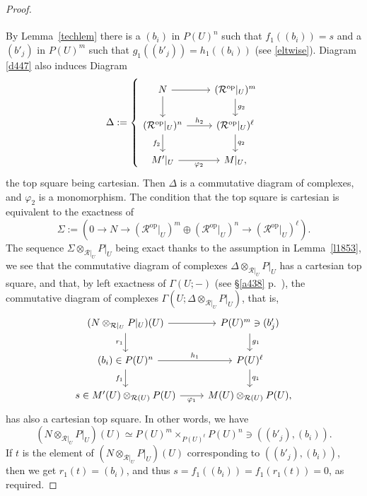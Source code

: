 \documentclass[12pt]{article}
\theoremstyle{remark}
\theoremstyle{definition}
\newcommand{\cc}{\mathcal}
\DeclareMathOperator{\op}{op}
\begin{document}
\begin{proof}
$$\begin{tikzcd}
\end{tikzcd}
$$ 
By Lemma~\ref{techlem} there is a $(b_i)$ in $P(U)^n$ such that $f_1((b_i))=s$ and a $(b'_j)$ in $P(U)^m$ such that $g_1((b'_j))=h_1((b_i))$ (see \eqref{eltwise}). Diagram \eqref{d447} also induces Diagram 
$$
\Delta:=\left\{
\begin{tikzcd}
N\ar{r}\ar{d}&(\cc R^{\op}|_U)^m\ar{d}{g_2}\\ 
(\cc R^{\op}|_U)^n\ar{r}{h_2}\ar{d}[swap]{f_2}&(\cc R^{\op}|_U)^\ell\ar{d}{q_2}\\ 
M'|_U\ar{r}[swap]{\varphi_2}&M|_U,
\end{tikzcd}
\right.
$$
the top square being cartesian. Then $\Delta$ is a commutative diagram of complexes, and $\varphi_2$ is a monomorphism. The condition that the top square is cartesian is equivalent to the exactness of 
%
\begin{equation}\label{tsc2}
\Sigma:=(0\to N\to(\cc R^{\op}|_U)^m\oplus(\cc R^{\op}|_U)^n\to(\cc R^{\op}|_U)^\ell).
\end{equation}
% 
The sequence $\Sigma\otimes_{\cc R|_U}P|_U$ being exact thanks to the assumption in Lemma~\ref{l1853}, we see that the commutative diagram of complexes $\Delta\otimes_{\cc R|_U}P|_U$ has a cartesian top square, and that, by left exactness of $\Gamma(U;-)$ (see \S\ref{a438} p.~\pageref{a438}), the commutative diagram of complexes $\Gamma(U;\Delta\otimes_{\cc R|_U}P|_U)$, that is, 
$$
\begin{tikzcd}
(N\otimes_{\cc R|_U}P|_U)(U)\ar{r}\ar{d}[swap]{r_1}&P(U)^m\ar{d}{g_1}\ni(b'_j)\\ 
(b_i)\in P(U)^n\ar{r}{h_1}\ar{d}[swap]{f_1}&P(U)^\ell\ar{d}{q_1}\\ 
s\in M'(U)\otimes_{\cc R(U)}P(U)\ar{r}[swap]{\varphi_1}&M(U)\otimes_{\cc R(U)}P(U),
\end{tikzcd}
$$ 
has also a cartesian top square. In other words, we have 
$$
(N\otimes_{\cc R|_U}P|_U)(U)\simeq P(U)^m\times_{P(U)^\ell}P(U)^n\ni((b'_j),(b_i)).
$$ 
If $t$ is the element of $(N\otimes_{\cc R|_U}P|_U)(U)$ corresponding to $((b'_j),(b_i))$, then we get $r_1(t)=(b_i)$, and thus $s=f_1((b_i))=f_1(r_1(t))=0$, as required.
\end{proof}
%
%
%
%
\end{document}
